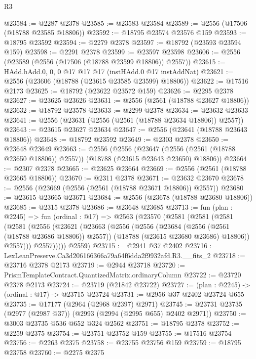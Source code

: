\begin{lexlean}{R3}
\begin{coremodule}
@23584 := @2287 @2378
@23585 := @23583 @23584
@23589 := @2556 (@17506 (@18788 @23585 @18806))
@23592 := @18795 @23574 @23576 @159
@23593 := @18795 @23592
@23594 := @2279 @2378
@23597 := @18792 (@23593 @23594 @159)
@23598 := @2291 @2378
@23599 := @23597 @23598
@23606 := @2556 (@23589 (@2556 (@17506 (@18788 @23599 @18806)) @2557))
@23615 := HAdd.hAdd.{0, 0, 0} @17 @17 @17 (instHAdd.{0} @17 instAddNat)
@23621 := @2556 (@23606 (@18788 (@23615 @23585 @23599) @18806))
@23622 := @17516 @2173
@23625 := @18792 (@23622 @23572 @159)
@23626 := @2295 @2378
@23627 := @23625 @23626
@23631 := @2556 (@2561 (@18788 @23627 @18806))
@23632 := @18792 @23578
@23633 := @2299 @2378
@23634 := @23632 @23633
@23641 := @2556 (@23631 (@2556 (@2561 (@18788 @23634 @18806)) @2557))
@23643 := @23615 @23627 @23634
@23647 := @2556 (@23641 (@18788 @23643 @18806))
@23648 := @18792 @23592
@23649 := @2303 @2378
@23650 := @23648 @23649
@23663 := @2556
    (@2556
      (@23647 (@2556 (@2561 (@18788 @23650 @18806)) @2557))
      (@18788 (@23615 @23643 @23650) @18806))
@23664 := @2307 @2378
@23665 := @23625 @23664
@23669 := @2556 (@2561 (@18788 @23665 @18806))
@23670 := @2311 @2378
@23671 := @23632 @23670
@23678 := @2556 (@23669 (@2556 (@2561 (@18788 @23671 @18806)) @2557))
@23680 := @23615 @23665 @23671
@23684 := @2556 (@23678 (@18788 @23680 @18806))
@23685 := @2315 @2378
@23686 := @23648 @23685
@23713 := fun (plan : @2245) =>
  fun (ordinal : @17) =>
  @2563
    (@23570
      (@2581
        (@2581
          (@2581
            (@2581
              (@2556
                (@23621
                  (@23663
                    (@2556
                      (@2556
                        (@23684 (@2556 (@2561 (@18788 @23686 @18806)) @2557))
                        (@18788 (@23615 @23680 @23686) @18806))
                      @2557)))
                @2557)))))
      @2559)
@23715 := @2941 @37 @2402
@23716 := LexLeanPreserve.Ca3d206166366a79a64f6dda2f9932afd.R3.__fits_2
@23718 := @23716 @2378 @2173
@23719 := @2944 @23718
@23720 := PrismTemplateContract.QuantizedMatrix.ordinaryColumn
@23722 := @23720 @2378 @2173
@23724 := @23719 (@21842 @23722)
@23727 := (plan : @2245) -> (ordinal : @17) -> @23715 @23724
@23731 := @2956 @37 @2402 @23724 @655
@23735 := @17177 (@2964 (@2968 @2397) @2971)
@23745 := @23731 @23735 (@2977 (@2987 @37)) (@2993 (@2994 (@2995 @655) @2402 @2971))
@23750 := @3003 @23735 @536 @652 @324 @2562
@23751 := @18795 @2378
@23752 := @2259 @2375
@23754 := @23751 @23752 @159
@23755 := @17516 @23754
@23756 := @2263 @2375
@23758 := @23755 @23756 @159
@23759 := @18795 @23758
@23760 := @2275 @2375

\end{coremodule}
\end{lexlean}
